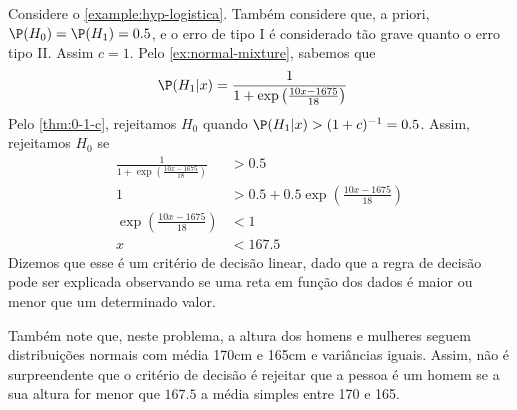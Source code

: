 \begin{example}
 Considere o \cref{example:hyp-logistica}. 
 Também considere que, a priori, 
 $\P(H_{0})=\P(H_{1})=0.5$,
 e o erro de tipo I é considerado tão 
 grave quanto o erro tipo II. Assim $c=1$.
 Pelo \cref{ex:normal-mixture}, sabemos que
 \begin{align*}
  \P(H_{1}|x)
  &=\frac{1}{1 + \exp\left(\frac{10x-1675}{18}\right)}
 \end{align*}
 Pelo \cref{thm:0-1-c}, rejeitamos $H_{0}$ quando
 $\P(H_{1}|x) > (1+c)^{-1} = 0.5$.
 Assim, rejeitamos $H_{0}$ se
 \begin{align*}
  \frac{1}{1+\exp\left(\frac{10x-1675}{18}\right)} 
  &> 0.5 \\
  1
  &> 0.5 + 0.5\exp\left(\frac{10x-1675}{18}\right) \\
  \exp\left(\frac{10x-1675}{18}\right) &< 1 \\
  x &< 167.5
 \end{align*}
 Dizemos que esse é um critério de decisão linear,
 dado que a regra de decisão pode ser 
 explicada observando se uma reta em função dos dados é
 maior ou menor que um determinado valor.
 
 Também note que, neste problema,
 a altura dos homens e mulheres seguem 
 distribuições normais com média 170cm e 165cm e 
 variâncias iguais.
 Assim, não é surpreendente que o critério de decisão
 é rejeitar que a pessoa é um homem se a sua altura
 for menor que $167.5$ a média simples entre 170 e 165.
\end{example}

